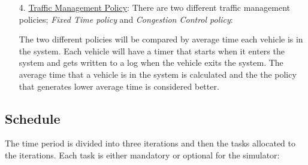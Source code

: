 \documentclass[11pt]{article}
\begin{document}
\begin{description}
\begin{itemize}
		\item[4. ] \underline{Traffic Management Policy}: There are two different traffic management policies; \textit{Fixed Time policy} and \textit{Congestion Control policy}:

		
The two different policies will be compared by average time each vehicle is in the system. Each vehicle will have a timer that starts when it enters the system and gets written to a log when the vehicle exits the system. The average time that a vehicle is in the system is calculated and the the policy that generates lower average time is considered better.
		 		
		
	\end{itemize}
\end{description}

\subsection{Schedule}

The time period is divided into three iterations and then the tasks allocated to the iterations. Each task is either mandatory or optional for the simulator:
\end{document}
